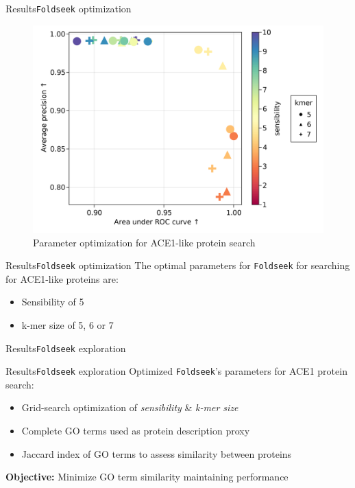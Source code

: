\documentclass{beamer}
\begin{document}
\begin{frame}{Results}{\texttt{Foldseek} optimization}
	\begin{figure}
	\includegraphics[width=0.8\linewidth]{figures/AuROCvsAuPRC_optimization.png}
	\caption{Parameter optimization for ACE1-like protein search}
	\end{figure}
\end{frame}

\begin{frame}{Results}{\texttt{Foldseek} optimization}
	The optimal parameters for \texttt{Foldseek} for searching for ACE1-like proteins are:
	\begin{itemize}
		\item Sensibility of 5
		\item k-mer size of 5, 6 or 7
	\end{itemize}
\end{frame}

\begin{frame}{Results}{\texttt{Foldseek} exploration}
\end{frame}

\begin{frame}{Results}{\texttt{Foldseek} exploration}
	Optimized \texttt{Foldseek}'s parameters for ACE1 protein search:\pause
	\begin{itemize}
		\item Grid-search optimization of \textit{sensibility} \& \textit{k-mer size}\pause 
		\item Complete GO terms used as protein description proxy \pause
		\item Jaccard index of GO terms to assess similarity between proteins \pause
	\end{itemize}

	\bigskip

	\textbf{Objective:} Minimize GO term similarity maintaining performance

\end{frame}
\end{document}
